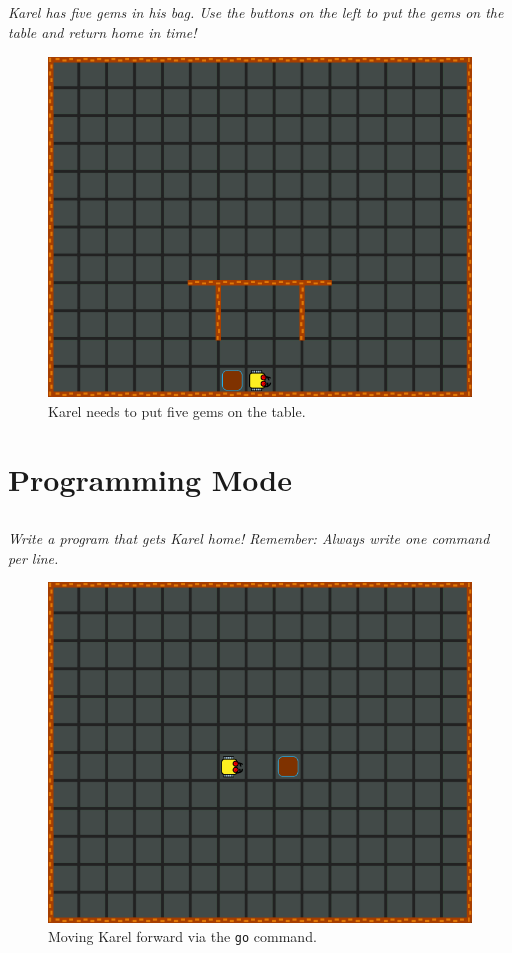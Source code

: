 \documentclass[article,A4,12pt]{llncs}
\begin{document}
\subsection{}

{\em Karel has five gems in his bag. Use the buttons on the left to put the gems on the table and 
return home in time!}

\begin{figure}[!ht]
\begin{center}
\includegraphics[height=0.4\textwidth]{imgk/a13.png}
\end{center}
\vspace{-4mm}
\caption{Karel needs to put five gems on the table.}
\label{fig:a13}
\vspace{-4mm}
\end{figure}
\noindent

\section{Programming Mode}

\subsection{}

{\em Write a program that gets Karel home! Remember: Always write one command per line.}

\begin{figure}[!ht]
\begin{center}
\includegraphics[height=0.4\textwidth]{imgk/b01.png}
\end{center}
\vspace{-4mm}
\caption{Moving Karel forward via the {\tt go} command.}
\label{fig:b01}
\vspace{-4mm}
\end{figure}
\noindent
\end{document}
